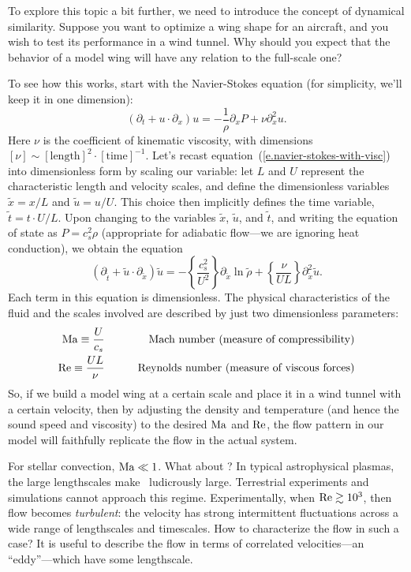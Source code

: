 To explore this topic a bit further, we need to introduce the concept of dynamical similarity.  Suppose you want to optimize a wing shape for an aircraft, and you wish to test its performance in a wind tunnel.  Why should you expect that the behavior of a model wing will have any relation to the full-scale one?  

To see how this works, start with the Navier-Stokes equation (for simplicity, we'll keep it in one dimension):
\begin{equation}\label{e.navier-stokes-with-visc}
	(\partial_{t} + u\cdot\partial_{x})u = -\frac{1}{\rho}\partial_{x}P + \nu \partial_{x}^{2}u.
\end{equation}
Here $\nu$ is the coefficient of kinematic viscosity, with dimensions $[\nu]\sim [\textrm{length}]^{2}\cdot [\textrm{time}]^{-1}$.
Let's recast equation~(\ref{e.navier-stokes-with-visc}) into dimensionless form by scaling our variable: let $L$ and $U$ represent the characteristic length and velocity scales, and define the dimensionless variables $\tilde{x} = x / L$ and $\tilde{u} = u / U$. This choice then implicitly defines the time variable, $\tilde{t} = t\cdot U/L$. Upon changing to the variables $\tilde{x}$, $\tilde{u}$, and $\tilde{t}$, and writing the equation of state as $P = c_{s}^{2} \rho$ (appropriate for adiabatic flow---we are ignoring heat conduction), we obtain the equation
\begin{equation}\label{e.scaled-NS}
	(\partial_{\tilde{t}} + \tilde{u}\cdot\partial_{\tilde{x}})\tilde{u} = -\left\{\frac{c_{s}^{2}}{U^{2}}\right\}\partial_{\tilde{x}}\ln\tilde{\rho} + \left\{\frac{\nu}{UL}\right\} \partial_{\tilde{x}}^{2}\tilde{u}.
\end{equation}
Each term in this equation is dimensionless.  The physical characteristics of the fluid and the scales involved are described by just two dimensionless parameters:
\begin{eqnarray*}
 \mathrm{Ma}\equiv\frac{U}{c_{s}}&\qquad& \textrm{Mach number (measure of compressibility)}\\
 \mathrm{Re}\equiv \frac{UL}{\nu} &\qquad& \textrm{Reynolds number (measure of viscous forces)}
\end{eqnarray*}
So, if we build a model wing at a certain scale and place it in a wind tunnel with a certain velocity, then by adjusting the density and temperature (and hence the sound speed and viscosity) to the desired $\mathrm{Ma}$ and $\mathrm{Re}$, the flow pattern in our model will faithfully replicate the flow in the actual system.

For stellar  convection, $\mathrm{Ma}\ll 1$. What about \Rey?  In typical astrophysical plasmas, the large lengthscales make \Rey\ ludicrously large. Terrestrial experiments and simulations cannot approach this regime. Experimentally, when $\mathrm{Re} \gtrsim 10^{3}$, then flow becomes \emph{turbulent}: the velocity has strong intermittent fluctuations across a wide range of lengthscales and timescales.  How to characterize the flow in such a case? It is useful to describe the flow in terms of correlated velocities---an ``eddy''---which have some lengthscale.

